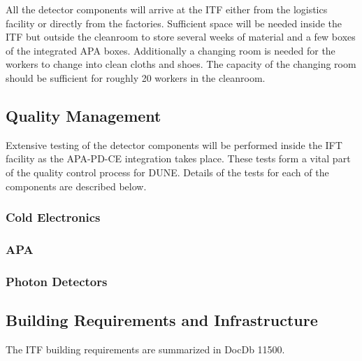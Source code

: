 All the detector  components will arrive at the ITF either from the logistics facility or directly from the factories. Sufficient space will be needed inside the ITF but outside the cleanroom to store several weeks of material and a few boxes of the integrated APA boxes. Additionally a changing room is needed for the workers to change into clean cloths and shoes. The capacity of the changing room should be sufficient for roughly 20 workers in the cleanroom. 

\subsection{Quality Management}
\label{sec:fdsp-tc-itf-qaqc}
Extensive testing of the detector components will be performed inside the IFT facility as the APA-PD-CE integration takes place. These tests form a vital part of the quality control process for DUNE. Details of the tests for each of the components are described below.

\subsubsection{Cold Electronics}

\subsubsection{APA}

\subsubsection{Photon Detectors}

\subsection{Building Requirements and Infrastructure}
\label{sec:fdsp-tc-itf-req}
The ITF building requirements are summarized in DocDb 11500.
\cite{bib:docdb11500} 

